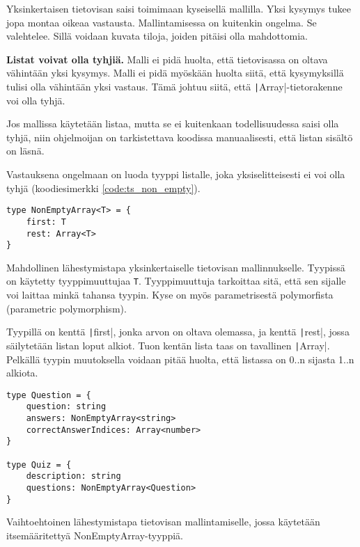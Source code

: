 Yksinkertaisen tietovisan saisi toimimaan kyseisellä mallilla. Yksi kysymys tukee jopa montaa oikeaa vastausta.
Mallintamisessa on kuitenkin ongelma. Se valehtelee. Sillä voidaan kuvata tiloja, joiden pitäisi olla mahdottomia.

\textbf{Listat voivat olla tyhjiä.} Malli ei pidä huolta, että tietovisassa on oltava vähintään yksi kysymys. Malli ei pidä myöskään huolta siitä, että kysymyksillä tulisi olla vähintään yksi vastaus. Tämä johtuu siitä, että \texttt|Array|-tietorakenne voi olla tyhjä.

Jos mallissa käytetään listaa, mutta se ei kuitenkaan todellisuudessa saisi olla tyhjä, niin ohjelmoijan on tarkistettava koodissa manuaalisesti, että listan sisältö on läsnä.

Vastauksena ongelmaan on luoda tyyppi listalle, joka yksiselitteisesti ei voi olla tyhjä (koodiesimerkki \ref{code:ts_non_empty}).

\begin{code}
    \begin{verbatim}
type NonEmptyArray<T> = {
    first: T
    rest: Array<T>
}
    \end{verbatim}
    \caption{Mahdollinen lähestymistapa yksinkertaiselle tietovisan mallinnukselle. Tyypissä on käytetty tyyppimuuttujaa \texttt{T}. Tyyppimuuttuja tarkoittaa sitä, että sen sijalle voi laittaa minkä tahansa tyypin. Kyse on myös parametrisestä polymorfista (parametric polymorphism).}
    \label{code:ts_non_empty}
\end{code}

Tyypillä on kenttä \texttt|first|, jonka arvon on oltava olemassa, ja kenttä \texttt|rest|, jossa säilytetään listan loput alkiot. Tuon kentän lista taas on tavallinen \texttt|Array|. Pelkällä tyypin muutoksella voidaan pitää huolta, että listassa on 0..n sijasta 1..n alkiota.

\begin{code}
    \begin{verbatim}
type Question = {
    question: string
    answers: NonEmptyArray<string> 
    correctAnswerIndices: Array<number>
}

type Quiz = {
    description: string
    questions: NonEmptyArray<Question> 
}       
    \end{verbatim}
    \caption{Vaihtoehtoinen lähestymistapa tietovisan mallintamiselle, jossa käytetään itsemääritettyä NonEmptyArray-tyyppiä.}
    \label{code:ts_non_empty_quiz}
\end{code}

